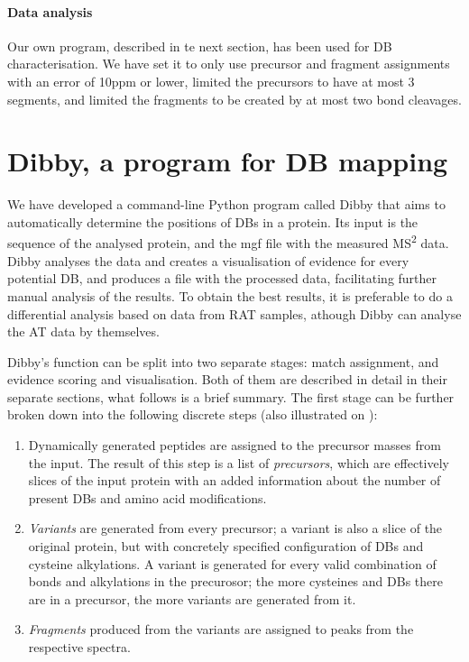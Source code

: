 \paragraph{Data analysis} Our own program, described in te next section, has been used for DB characterisation. We have set it to only use precursor and fragment assignments with an error of 10ppm or lower, limited the precursors to have at most 3 segments, and limited the fragments to be created by at most two bond cleavages.

\section{Dibby, a program for DB mapping}

We have developed a command-line Python program called Dibby that aims to automatically determine the positions of DBs in a protein. Its input is the sequence of the analysed protein, and the mgf file with the measured MS\textsuperscript{2} data. Dibby analyses the data and creates a visualisation of evidence for every potential DB, and produces a file with the processed data, facilitating further manual analysis of the results. To obtain the best results, it is preferable to do a differential analysis based on data from RAT samples, athough Dibby can analyse the AT data by themselves.

Dibby's function can be split into two separate stages: match assignment, and evidence scoring and visualisation. Both of them are described in detail in their separate sections, what follows is a brief summary. The first stage can be further broken down into the following discrete steps (also illustrated on ):

\begin{enumerate}
  \item Dynamically generated peptides are assigned to the precursor masses from the input. The result of this step is a list of \emph{precursors}, which are effectively slices of the input protein with an added information about the number of present DBs and amino acid modifications.
  \item \emph{Variants} are generated from every precursor; a variant is also a slice of the original protein, but with concretely specified configuration of DBs and cysteine alkylations. A variant is generated for every valid combination of bonds and alkylations in the precurosor; the more cysteines and DBs there are in a precursor, the more variants are generated from it.
  \item \emph{Fragments} produced from the variants are assigned to peaks from the respective spectra.
\end{enumerate}

